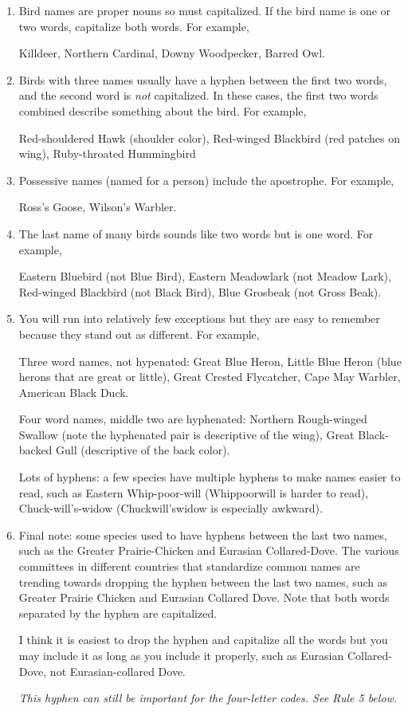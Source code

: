 \documentclass[11pt]{article}
\begin{document}
\begin{enumerate}
\item Bird names are proper nouns so must capitalized. If the bird name is one or two words, capitalize both words. For example,

Killdeer, Northern Cardinal, Downy Woodpecker, Barred Owl.

\item Birds with three names usually have a hyphen between the first two words, and the second word is \emph{not} capitalized.  In these cases, the first two words combined describe something about the bird. For example,

Red-shouldered Hawk (shoulder color), Red-winged Blackbird (red patches on wing), Ruby-throated Hummingbird

\item Possessive names (named for a person) include the apostrophe. For example,

Ross's Goose, Wilson's Warbler.

\item The last name of many birds sounds like two words but is one word. For example,

Eastern Bluebird (not Blue Bird), Eastern Meadowlark (not Meadow Lark), Red-winged Blackbird (not Black Bird), Blue Grosbeak (not Gross Beak).

\item You will run into relatively few exceptions but they are easy to remember because they stand out as different. For example,

Three word names, not hypenated: Great Blue Heron, Little Blue Heron (blue herons that are great or little), Great Crested Flycatcher, Cape May Warbler, American Black Duck. 

Four word names, middle two are hyphenated: Northern Rough-winged Swallow (note the hyphenated pair is descriptive of the wing), Great Black-backed Gull (descriptive of the back color).

Lots of hyphens: a few species have multiple hyphens to make names easier to read, such as Eastern Whip-poor-will (Whippoorwill is harder to read), Chuck-will's-widow (Chuckwill'swidow is especially awkward).

\item Final note: some species used to have hyphens between the last two names, such as the Greater Prairie-Chicken and Eurasian Collared-Dove. The various committees in different countries that standardize common names are trending towards dropping the hyphen between the last two names, such as Greater Prairie Chicken and Eurasian Collared Dove. Note that both words separated by the hyphen are capitalized.

I think it is easiest to drop the hyphen and capitalize all the words but you may include it as long as you include it properly, such as Eurasian Collared-Dove, not Eurasian-collared Dove. 

\emph{This hyphen can still be important for the four-letter codes. See Rule 5 below.}


\end{enumerate}
\end{document}
